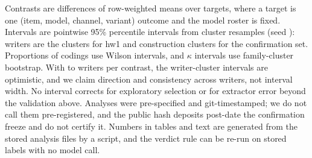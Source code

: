 Contrasts are differences of row-weighted means over targets, where a target is one (item, model, channel, variant) outcome and the model roster is fixed.
Intervals are pointwise 95\% percentile intervals from \jmhwBootN{} cluster resamples (seed \jmhwSeed{}): writers are the clusters for hw1 and construction clusters for the confirmation set.
Proportions of codings use Wilson intervals, and $\kappa$ intervals use family-cluster bootstrap.
With \jmhwWrMin{} to \jmhwWrMax{} writers per contrast, the writer-cluster intervals are optimistic, and we claim direction and consistency across writers, not interval width.
No interval corrects for exploratory selection or for extractor error beyond the validation above.
Analyses were pre-specified and git-timestamped; we do not call them pre-registered, and the public hash deposits post-date the confirmation freeze and do not certify it.
Numbers in tables and text are generated from the stored analysis files by a script, and the verdict rule can be re-run on stored labels with no model call.

